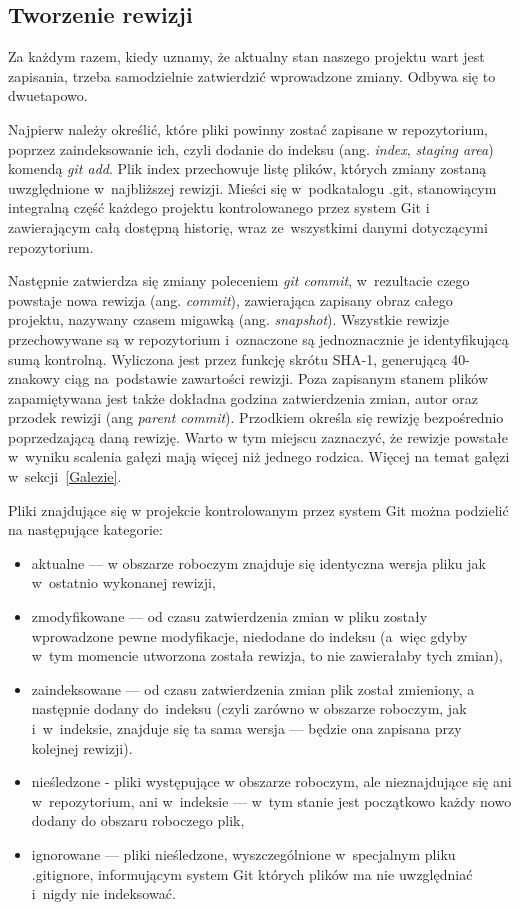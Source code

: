\documentclass[12pt,a4paper,polish,thesis]{dcsbook}
\begin{document}
	\subsection{Tworzenie rewizji}
	Za każdym razem, kiedy uznamy, że aktualny stan naszego projektu wart jest zapisania, trzeba samodzielnie zatwierdzić wprowadzone zmiany. Odbywa się to dwuetapowo.

	Najpierw należy określić, które pliki powinny zostać zapisane w repozytorium, poprzez zaindeksowanie ich, czyli dodanie do indeksu (ang. \textit{index}, \textit{staging area}) komendą \textit{git add}. Plik index przechowuje listę plików, których zmiany zostaną uwzględnione w~najbliższej rewizji. Mieści się w~podkatalogu .git, stanowiącym integralną część każdego projektu kontrolowanego przez system Git i zawierającym całą dostępną historię, wraz ze~wszystkimi danymi dotyczącymi repozytorium.

	Następnie zatwierdza się zmiany poleceniem \textit{git commit}, w~rezultacie czego powstaje nowa rewizja (ang. \textit{commit}), zawierająca zapisany obraz całego projektu, nazywany czasem migawką (ang. \textit{snapshot}). Wszystkie rewizje przechowywane są w repozytorium i~oznaczone są jednoznacznie je identyfikującą sumą kontrolną. Wyliczona jest przez funkcję skrótu \mbox{SHA-1}, generującą 40-znakowy ciąg na~podstawie zawartości rewizji. Poza zapisanym stanem plików zapamiętywana jest także dokładna godzina zatwierdzenia zmian, autor oraz przodek rewizji (ang \textit{parent commit}). Przodkiem określa się rewizję bezpośrednio poprzedzającą daną rewizję. Warto w tym miejscu zaznaczyć, że rewizje powstałe w~wyniku scalenia gałęzi mają więcej niż jednego rodzica. Więcej na temat gałęzi w~sekcji~\ref{Galezie}.

	Pliki znajdujące się w projekcie kontrolowanym przez system Git można podzielić na następujące kategorie:
	\begin{itemize}
		\item aktualne --- w obszarze roboczym znajduje się identyczna wersja pliku jak w~ostatnio wykonanej rewizji,
		\item zmodyfikowane --- od czasu zatwierdzenia zmian w pliku zostały wprowadzone pewne modyfikacje, niedodane do indeksu (a~więc gdyby w~tym momencie utworzona została rewizja, to nie zawierałaby tych zmian),
		\item zaindeksowane --- od czasu zatwierdzenia zmian plik został zmieniony, a następnie dodany do~indeksu (czyli zarówno w obszarze roboczym, jak i~w~indeksie, znajduje się ta sama wersja --- będzie ona zapisana przy kolejnej rewizji).
		\item nieśledzone - pliki występujące w obszarze roboczym, ale nieznajdujące się ani w~repozytorium, ani w~indeksie --- w~tym stanie jest początkowo każdy nowo dodany do obszaru roboczego plik,
		\item ignorowane --- pliki nieśledzone, wyszczególnione w~specjalnym pliku .gitignore, informującym system Git których plików ma nie uwzględniać i~nigdy nie indeksować.
	\end{itemize}
\end{document}
